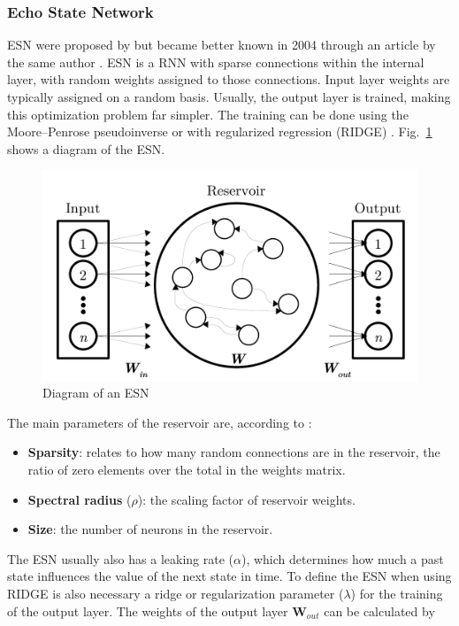 \subsubsection{Echo State Network}
\ac{ESN} were proposed by  but became better known in 2004 through an article by the same author \cite{jaeger2004Harnessing}. \ac{ESN} is a \ac{RNN} with sparse connections within the internal layer, with random weights assigned to those connections. Input layer weights are typically assigned on a random basis. Usually, the output layer is trained, making this optimization problem far simpler. The training can be done using the Moore–Penrose pseudoinverse or with  regularized regression (\ac{RIDGE}) \cite{tikhonov1995Regularization}. Fig.~\ref{fig:esn} shows a diagram of the \ac{ESN}.

\begin{figure}[!htb]
    \centerline{\includegraphics[width=0.8\linewidth]{Media/ESN_en.pdf}}
    \caption{Diagram of an ESN}
    \label{fig:esn}
\end{figure}

The main parameters of the reservoir are, according to :

\begin{itemize}
    \item \textbf{Sparsity}: relates to how many random connections are in the reservoir, the ratio of zero elements over the total in the weights matrix.
    \item \textbf{Spectral radius} ($\rho$): the scaling factor of reservoir weights.
    \item \textbf{Size}: the number of neurons in the reservoir.
\end{itemize}

The \ac{ESN} usually also has a leaking rate ($\alpha$), which determines how much a past state influences the value of the next state in time. To define the \ac{ESN} when using \ac{RIDGE} is also necessary a ridge or regularization parameter ($\lambda$) for the training of the output layer. The weights of the output layer $\mathbf{W}_{out}$ can be calculated by


